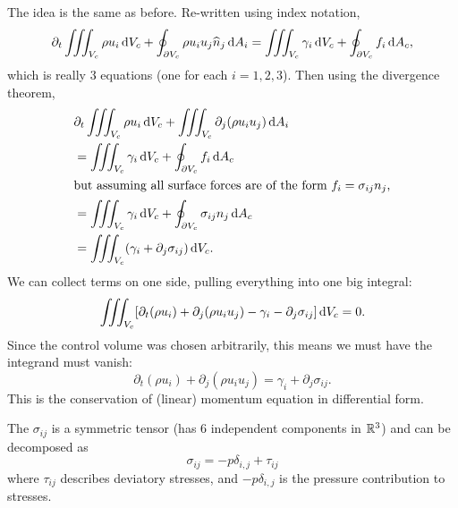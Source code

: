\begin{node}
The idea is the same as before. Re-written using index notation,
\begin{equation}
\partial_{t}\iiint_{V_{c}}\rho u_{i}\,\mathrm{d} V_{c} + \oint_{\partial V_{c}}\rho u_{i}u_{j}\widehat{n}_{j}\,\mathrm{d} A_{i}
=\iiint_{V_{c}}\gamma_{i}\,\mathrm{d} V_{c}+\oint_{\partial V_{c}}f_{i}\,\mathrm{d} A_{c},
\end{equation}
which is really 3 equations (one for each $i=1,2,3$). Then using the
divergence theorem,
\begin{subequations}
  \begin{align}
&\partial_{t}\iiint_{V_{c}}\rho u_{i}\,\mathrm{d} V_{c} + \iiint_{V_{c}}\partial_{j}(\rho u_{i}u_{j})\,\mathrm{d} A_{i}\nonumber\\
&=\iiint_{V_{c}}\gamma_{i}\,\mathrm{d} V_{c} + \oint_{\partial V_{c}}f_{i}\,\mathrm{d} A_{c}\\
\intertext{but assuming all surface forces are of the form $f_{i}=\sigma_{ij}n_{j}$,}
&=\iiint_{V_{c}}\gamma_{i}\,\mathrm{d} V_{c} + \oint_{\partial V_{c}}\sigma_{ij}n_{j}\,\mathrm{d} A_{c}\\
&=\iiint_{V_{c}}(\gamma_{i} + \partial_{j}\sigma_{ij})\,\mathrm{d} V_{c}.
  \end{align}
\end{subequations}
We can collect terms on one side, pulling everything into one big integral:
\begin{equation}
\iiint_{V_{c}}[\partial_{t}(\rho u_{i})+\partial_{j}(\rho u_{i}u_{j})
  - \gamma_{i} - \partial_{j}\sigma_{ij}]\,\mathrm{d} V_{c}=0.
\end{equation}
Since the control volume was chosen arbitrarily, this means we must
have the integrand must vanish:
\begin{equation}
\partial_{t}(\rho u_{i}) + \partial_{j}(\rho u_{i}u_{j}) = \gamma_{i} + \partial_{j}\sigma_{ij}.
\end{equation}
This is the conservation of (linear) momentum equation in differential form.
\end{node}

\begin{definition}
The  $\sigma_{ij}$ is a symmetric tensor (has 6
independent components in $\mathbb{R}^{3}$) and can be decomposed as
\begin{equation}
\sigma_{ij}=-p\delta_{i,j}+\tau_{ij}
\end{equation}
where $\tau_{ij}$ describes deviatory stresses, and $-p\delta_{i,j}$
is the pressure contribution to stresses.
\end{definition}

